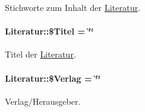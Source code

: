 Stichworte zum Inhalt der \hyperlink{classLiteratur}{Literatur}. 

\hypertarget{classLiteratur_e30f9e9db9b396e6f87adfdb94e12ba0}{
\paragraph[\$Titel]{\setlength{\rightskip}{0pt plus 5cm}Literatur::\$Titel = \char`\"{}\char`\"{}}\hfill}
\label{classLiteratur_e30f9e9db9b396e6f87adfdb94e12ba0}


Titel der \hyperlink{classLiteratur}{Literatur}. 

\hypertarget{classLiteratur_5f591208e5d21bb81e6c51484e2a60e0}{
\paragraph[\$Verlag]{\setlength{\rightskip}{0pt plus 5cm}Literatur::\$Verlag = \char`\"{}\char`\"{}}\hfill}
\label{classLiteratur_5f591208e5d21bb81e6c51484e2a60e0}


Verlag/Herausgeber. 

